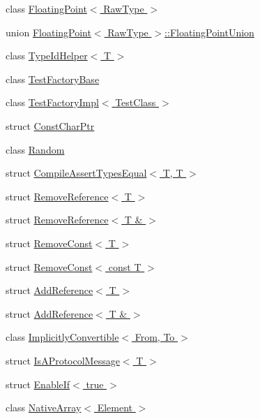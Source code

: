 \begin{DoxyCompactItemize}
class \hyperlink{classtesting_1_1internal_1_1FloatingPoint}{\-Floating\-Point$<$ Raw\-Type $>$}
\item 
union \hyperlink{uniontesting_1_1internal_1_1FloatingPoint_1_1FloatingPointUnion}{\-Floating\-Point$<$ Raw\-Type $>$\-::\-Floating\-Point\-Union}
\item 
class \hyperlink{classtesting_1_1internal_1_1TypeIdHelper}{\-Type\-Id\-Helper$<$ T $>$}
\item 
class \hyperlink{classtesting_1_1internal_1_1TestFactoryBase}{\-Test\-Factory\-Base}
\item 
class \hyperlink{classtesting_1_1internal_1_1TestFactoryImpl}{\-Test\-Factory\-Impl$<$ Test\-Class $>$}
\item 
struct \hyperlink{structtesting_1_1internal_1_1ConstCharPtr}{\-Const\-Char\-Ptr}
\item 
class \hyperlink{classtesting_1_1internal_1_1Random}{\-Random}
\item 
struct \hyperlink{structtesting_1_1internal_1_1CompileAssertTypesEqual_3_01T_00_01T_01_4}{\-Compile\-Assert\-Types\-Equal$<$ T, T $>$}
\item 
struct \hyperlink{structtesting_1_1internal_1_1RemoveReference}{\-Remove\-Reference$<$ T $>$}
\item 
struct \hyperlink{structtesting_1_1internal_1_1RemoveReference_3_01T_01_6_01_4}{\-Remove\-Reference$<$ T \& $>$}
\item 
struct \hyperlink{structtesting_1_1internal_1_1RemoveConst}{\-Remove\-Const$<$ T $>$}
\item 
struct \hyperlink{structtesting_1_1internal_1_1RemoveConst_3_01const_01T_01_4}{\-Remove\-Const$<$ const T $>$}
\item 
struct \hyperlink{structtesting_1_1internal_1_1AddReference}{\-Add\-Reference$<$ T $>$}
\item 
struct \hyperlink{structtesting_1_1internal_1_1AddReference_3_01T_01_6_01_4}{\-Add\-Reference$<$ T \& $>$}
\item 
class \hyperlink{classtesting_1_1internal_1_1ImplicitlyConvertible}{\-Implicitly\-Convertible$<$ From, To $>$}
\item 
struct \hyperlink{structtesting_1_1internal_1_1IsAProtocolMessage}{\-Is\-A\-Protocol\-Message$<$ T $>$}
\item 
struct \hyperlink{structtesting_1_1internal_1_1EnableIf_3_01true_01_4}{\-Enable\-If$<$ true $>$}
\item 
class \hyperlink{classtesting_1_1internal_1_1NativeArray}{\-Native\-Array$<$ Element $>$}
\item 

\end{DoxyCompactItemize}
